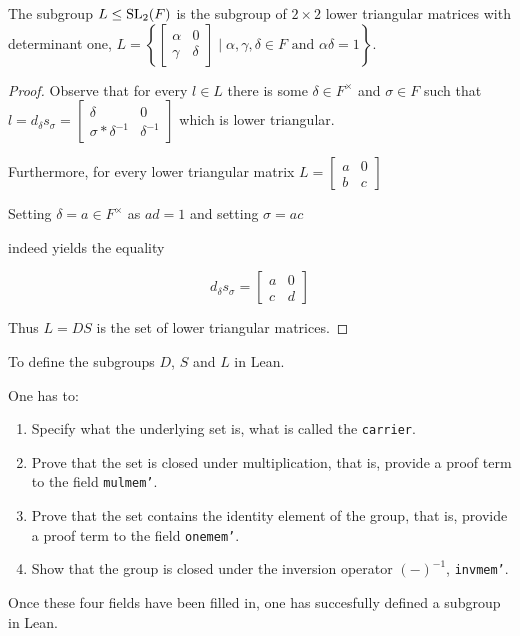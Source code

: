 \begin{corollary}
    \label{mem_L_iff_lower_triangular}
    \leanok
    The subgroup $L \le \operatorname{SL}_2(F)$ is the subgroup of $2 \times 2$ lower triangular matrices with determinant one, $L =\left\{\begin{bmatrix}
    \alpha & 0\\
    \gamma & \delta
    \end{bmatrix} \; | \; \alpha, \gamma, \delta \in F \text{ and } \alpha \delta = 1 \right\}$.
\end{corollary}
\begin{proof}
\leanok
    Observe that for every $l \in L$ there is some $\delta \in F^\times$ and $\sigma \in F$ such that $l  = d_\delta s_\sigma = \begin{bmatrix}
        \delta & 0\\
        \sigma * \delta^{-1} & \delta^{-1}
    \end{bmatrix}$ which is lower triangular. 
    
    Furthermore, for every lower triangular matrix $L = \begin{bmatrix}
        a & 0\\
        b & c
    \end{bmatrix}$ 
    
    Setting $\delta = a \in F^\times$ as $a d = 1$ and setting $\sigma = a c$

    indeed yields the equality

    \[
    d_\delta s_\sigma = \begin{bmatrix}
        a & 0\\
        c & d
    \end{bmatrix}
    \]

    Thus $L = D S$ is the set of lower triangular matrices.
\end{proof}


\begin{remark}
    To define the subgroups $D$, $S$ and $L$ in Lean. 
    
    One has to:
    
    \begin{enumerate}
        \item Specify what the underlying set is, what is called the \texttt{carrier}.
        \item Prove that the set is closed under multiplication, that is, provide a proof term to the field \texttt{mul\textunderscore mem'}.
        \item Prove that the set contains the identity element of the group, that is, provide a proof term to the field \texttt{one\textunderscore mem'}.
        \item Show that the group is closed under the inversion operator $(-)^{-1}$, \texttt{inv\textunderscore mem'}.
    \end{enumerate}

    Once these four fields have been filled in, one has succesfully defined a subgroup in Lean.
\end{remark}


